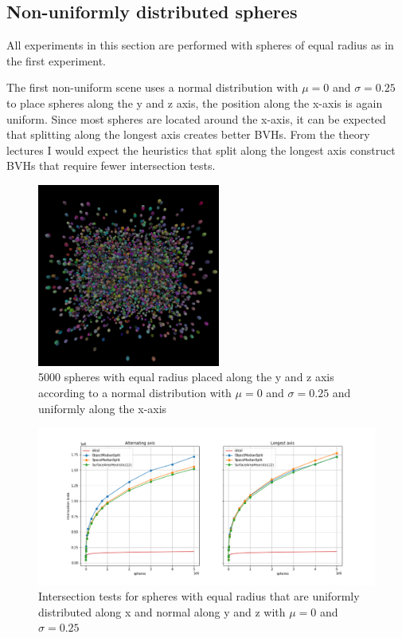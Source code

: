 \documentclass{article}
\begin{document}
\subsection{Non-uniformly distributed spheres}

All experiments in this section are performed with spheres of equal radius as in the first experiment.

The first non-uniform scene uses a normal distribution with $\mu = 0$ and $\sigma = 0.25$ to place spheres along the y and z axis, the position along the x-axis is again uniform. Since most spheres are located around the x-axis, it can be expected that splitting along the longest axis creates better BVHs. From the theory lectures I would expect the heuristics that split along the longest axis construct BVHs that require fewer intersection tests.

\begin{figure}[!htb]
    \centering
    \includegraphics[width=6cm]{renders/equal_spheres_normal_yz.png}
    \caption{5000 spheres with equal radius placed along the y and z axis according to a normal distribution with $\mu = 0$ and $\sigma = 0.25$ and uniformly along the x-axis}
    \label{fig:my_label}
\end{figure}

\begin{figure}[!htb]
    \centering
    \includegraphics[width=12cm]{plots/splitting_heuristics_equal_spheres_normal_yz.png}
    \caption{Intersection tests for spheres with equal radius that are uniformly distributed along x and normal along y and z with $\mu = 0$ and $\sigma = 0.25$ }
    \label{fig:splitting_heuristics_equal_spheres_normal_yz}
\end{figure}
\end{document}

